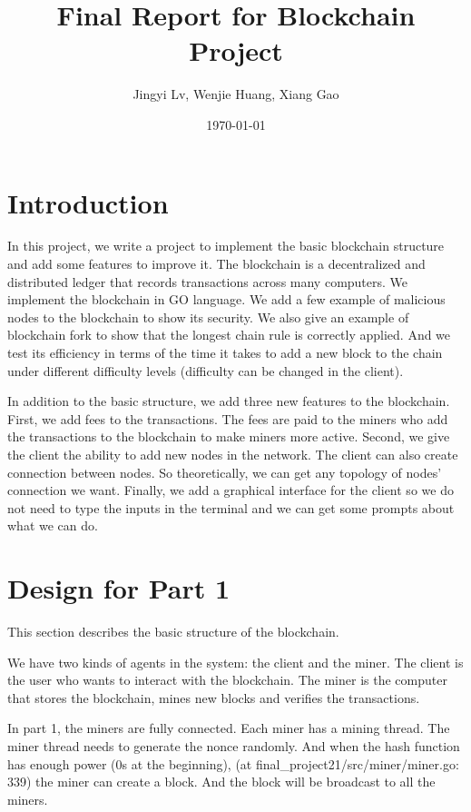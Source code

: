 \documentclass[12pt]{article}
\title{Final Report for Blockchain Project}
\author{Jingyi Lv, Wenjie Huang, Xiang Gao}
\date{\today}
\begin{document}
\maketitle



\section{Introduction}
In this project, we write a project to implement the basic blockchain structure and add some features to improve it.
The blockchain is a decentralized and distributed ledger that records transactions across many computers. 
We implement the blockchain in GO language. We add a few example of malicious nodes to the blockchain to show its security. 
We also give an example of blockchain fork to show that the longest chain rule is correctly applied.
And we test its efficiency in terms of the time it takes to add a new block to the chain under different difficulty levels (difficulty can be changed in the client).

In addition to the basic structure, we add three new features to the blockchain.
First, we add fees to the transactions. The fees are paid to the miners who add the transactions to the blockchain to make miners more active.
Second, we give the client the ability to add new nodes in the network. The client can also create connection between nodes. So theoretically, we can get any topology of nodes' connection we want.
Finally, we add a graphical interface for the client so we do not need to type the inputs in the terminal and we can get some prompts about what we can do.

\section{Design for Part 1}
This section describes the basic structure of the blockchain.

We have two kinds of agents in the system: the client and the miner. The client is the user who wants to interact with the blockchain. The miner is the computer that stores the blockchain, mines new blocks and verifies the transactions.

In part 1, the miners are fully connected. Each miner has a mining thread. The miner thread needs to generate the nonce randomly.
And when the hash function has enough power (0s at the beginning), (at final\_project21/src/miner/miner.go: 339) the miner can create a block. And the block will be broadcast to all the miners.
\end{document}
